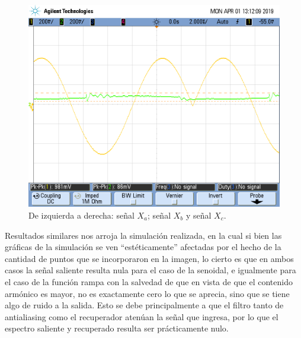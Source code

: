 \documentclass[../../ASSD_TP1_G7.tex]{subfiles}
\begin{document}
\begin{figure}[H]
\begin{centering}
\par\end{centering}
\begin{centering}
\includegraphics[scale=0.25]{Imagenes/ej_6_b_2}\caption{De izquierda a derecha: señal $X_{a}$; señal $X_{b}$ y señal $X_{c}$.}
\par\end{centering}
\end{figure}

Resultados similares nos arroja la simulación realizada, en la cual
si bien las gráficas de la simulación se ven ``estéticamente'' afectadas
por el hecho de la cantidad de puntos que se incorporaron en la imagen,
lo cierto es que en ambos casos la señal saliente resulta nula para
el caso de la senoidal, e igualmente para el caso de la función rampa
con la salvedad de que en vista de que el contenido armónico es mayor,
no es exactamente cero lo que se aprecia, sino que se tiene algo de
ruido a la salida. Esto se debe principalmente a que el filtro tanto de antialiasing como el recuperador atenúan la señal que ingresa, por lo que el espectro saliente y recuperado resulta ser prácticamente nulo.
\end{document}

